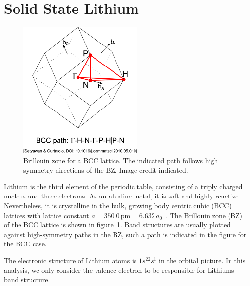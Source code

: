 \documentclass[a4paper,DIV=12,english]{scrartcl}
\begin{document}
\section{Solid State Lithium}
\begin{figure}
    \centering 
    \includegraphics[width=0.55\textwidth]{./fig/bcc_bz.png}
    \caption{Brillouin zone for a BCC lattice. The indicated path follows high symmetry directions of the BZ. Image credit indicated.}
    \label{fig:bcc_bz}
\end{figure}
Lithium is the third element of the periodic table, consisting of a triply charged nucleus and three electrons. As an alkaline metal, it is soft and highly reactive. Nevertheless, it is crystalline in the bulk, growing body centric cubic (BCC) lattices with lattice constant $a=350.0\,\text{pm}=6.632\,a_0$~\cite{wikiLithium}. The Brillouin zone (BZ) of the BCC lattice is shown in figure~\ref{fig:bcc_bz}. Band structures are usually plotted against high-symmetry paths in the BZ, such a path is indicated in the figure for the BCC case.

The electronic structure of Lithium atoms is $1s^22s^1$ in the orbital picture. In this analysis, we only consider the valence electron to be responsible for Lithiums band structure.

\FloatBarrier
\end{document}
